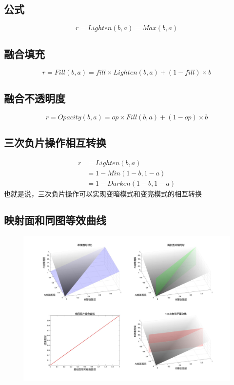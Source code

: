 \subsection{ 公式}


\begin{equation}r=Lighten(b,a)=Max(b,a)\end{equation}

\subsection{ 融合填充}


\begin{equation}r= Fill(b,a) =fill\times Lighten(b,a)+(1-fill)\times b\end{equation}

\subsection{ 融合不透明度}


\begin{equation}r=Opacity(b,a)=op\times Fill(b,a)+(1-op)\times b\end{equation}

\subsection{ 三次负片操作相互转换}


\begin{equation}\begin{aligned}
	r&=Lighten(b,a)\\&=1-Min(1-b,1-a)\\&= 1-Darken(1-b,1-a)
\end{aligned}\end{equation}
也就是说，三次负片操作可以实现变暗模式和变亮模式的相互转换
\newpage
\subsection{ 映射面和同图等效曲线}
\begin{figure}[h!]
	\centering
	\includegraphics[width=\linewidth]{figure/变亮}
	\caption{}
	\label{fig:}
\end{figure}


